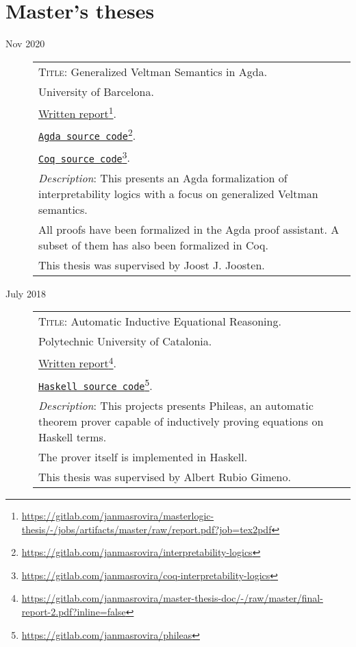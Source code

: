 \documentclass[11pt]{article}
\newcommand{\fnlink}[2]{\href{#1}{#2}\footnote{\url{#1}}}
\begin{document}
\section{Master's theses}

\begin{description}
\item[Nov 2020]
\begin{minipage}{\textwidth}

  \begin{tabular}{|p{12cm}}

    \textsc{Title}: Generalized Veltman Semantics in Agda. \\
    University of Barcelona. \\
    \fnlink{https://gitlab.com/janmasrovira/masterlogic-thesis/-/jobs/artifacts/master/raw/report.pdf?job=tex2pdf}{Written report}. \\
    \fnlink{https://gitlab.com/janmasrovira/interpretability-logics}{\texttt{Agda source code}}. \\
    \fnlink{https://gitlab.com/janmasrovira/coq-interpretability-logics}{\texttt{Coq source code}}. \\
    \textit{Description}: This presents an Agda formalization of interpretability logics with a focus on generalized Veltman semantics.
    \\All proofs have been formalized in the Agda proof assistant. A subset of them has also been formalized in Coq.
    \\This thesis was supervised by Joost J. Joosten.

  \end{tabular}
\end{minipage}

\item[July 2018]
  \begin{minipage}{\textwidth}
    \begin{tabular}{|p{12cm}}
      \textsc{Title}: Automatic Inductive Equational Reasoning. \\
      Polytechnic University of Catalonia. \\
      \fnlink{https://gitlab.com/janmasrovira/master-thesis-doc/-/raw/master/final-report-2.pdf?inline=false}{Written report}. \\
      \fnlink{https://gitlab.com/janmasrovira/phileas}{\texttt{Haskell source code}}. \\
      \textit{Description}: This projects presents Phileas, an automatic
      theorem prover capable of inductively proving equations on Haskell
      terms.
      \\The prover itself is implemented in Haskell.
      \\This thesis was supervised by Albert Rubio Gimeno.

    \end{tabular}
  \end{minipage}

\end{description}
\end{document}
